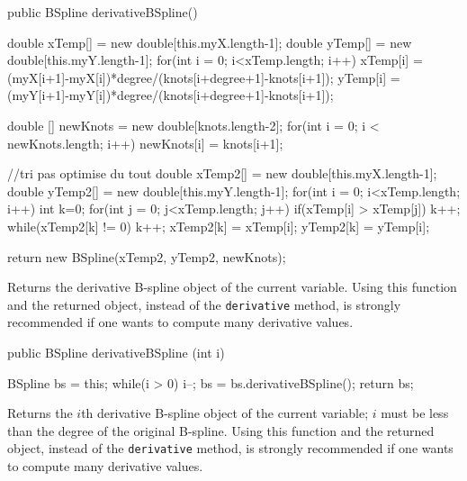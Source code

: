 \begin{code}

   public BSpline derivativeBSpline() \begin{hide} {
      double xTemp[] = new double[this.myX.length-1];
      double yTemp[] = new double[this.myY.length-1];
      for(int i = 0; i<xTemp.length; i++) {
         xTemp[i] = (myX[i+1]-myX[i])*degree/(knots[i+degree+1]-knots[i+1]);
         yTemp[i] = (myY[i+1]-myY[i])*degree/(knots[i+degree+1]-knots[i+1]);
      }

      double [] newKnots = new double[knots.length-2];
      for(int i = 0; i < newKnots.length; i++) {
         newKnots[i] = knots[i+1];
      }

      //tri pas optimise du tout
      double xTemp2[] = new double[this.myX.length-1];
      double yTemp2[] = new double[this.myY.length-1];
      for(int i = 0; i<xTemp.length; i++) {
         int k=0;
         for(int j = 0; j<xTemp.length; j++) {
            if(xTemp[i] > xTemp[j])
               k++;
         }
         while(xTemp2[k] != 0)
            k++;
         xTemp2[k] = xTemp[i];
         yTemp2[k] = yTemp[i];
      }

      return new BSpline(xTemp2, yTemp2, newKnots);
   }\end{hide}
\end{code}
\begin{tabb}
   Returns the derivative B-spline object of the current variable.
   Using this function and the returned object, instead of the
  \texttt{derivative} method,
   is strongly recommended if one wants to compute many derivative values.
\end{tabb}
\begin{htmlonly}
\end{htmlonly}
\begin{code}

   public BSpline derivativeBSpline (int i) \begin{hide} {
      BSpline bs = this;
      while(i > 0) {
         i--;
         bs = bs.derivativeBSpline();
      }
      return bs;
   }\end{hide}
\end{code}
\begin{tabb}
   Returns the $i$th derivative B-spline object of the current variable;
   $i$ must be less than the degree of the original B-spline.
   Using this function and the returned object, instead of the
  \texttt{derivative} method,
   is strongly recommended if one wants to compute many derivative values.
\end{tabb}
